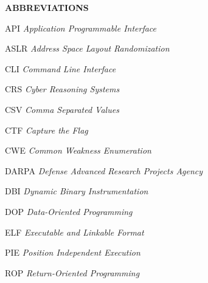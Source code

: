 \newenvironment{abbreviations}{\begin{list}{}{\renewcommand{\makelabel}{\abbrlabel}}}{\end{list}}
\newcommand{\abbrlabel}[1]{\makebox[3cm][l]{\textbf{#1}\ \dotfill}}

\thispagestyle{front}

\textbf{\large ABBREVIATIONS}\par
\begin{abbreviations}
    \item[API] \textit{Application Programmable Interface}
    \item[ASLR] \textit{Address Space Layout Randomization}
    \item[CLI] \textit{Command Line Interface}
    \item[CRS] \textit{Cyber Reasoning Systems}
    \item[CSV] \textit{Comma Separated Values}
    \item[CTF] \textit{Capture the Flag}
    \item[CWE] \textit{Common Weakness Enumeration}
    \item[DARPA] \textit{Defense Advanced Research Projects Agency}
    \item[DBI] \textit{Dynamic Binary Instrumentation}
    \item[DOP] \textit{Data-Oriented Programming}
    \item[ELF] \textit{Executable and Linkable Format}
    \item[PIE] \textit{Position Independent Execution}
    \item[ROP] \textit{Return-Oriented Programming}
\end{abbreviations}